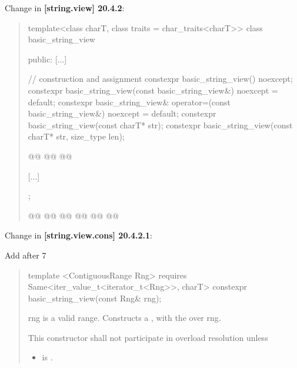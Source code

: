 \documentclass{wg21}
\begin{document}
Change in \textbf{[string.view] 20.4.2}:
\begin{quote}
\begin{codeblock}

template<class charT, class traits = char_traits<charT>>
class basic_string_view {
public:
	[...]

	// construction and assignment
	constexpr basic_string_view() noexcept;
	constexpr basic_string_view(const basic_string_view&) noexcept = default;
	constexpr basic_string_view& operator=(const basic_string_view&) noexcept = default;
	constexpr basic_string_view(const charT* str);
	constexpr basic_string_view(const charT* str, size_type len);

	@@
	@@
	@@

	[...]
};

@@
@@
@@
@@
@@
@\added{\qquad 	>;}@

\end{codeblock}
\end{quote}

Change in \textbf{[string.view.cons] 20.4.2.1}:

Add after 7

\begin{quote}
\begin{addedblock}
\begin{itemdecl}
template <ContiguousRange Rng>
requires Same<iter_value_t<iterator_t<Rng>>, charT>
constexpr basic_string_view(const Rng& rng);

\end{itemdecl}

\begin{itemdescr}
	\requires
	rng is a valid range.
	\effects
	Constructs a , with the over  rng.

	 \remarks This constructor shall not participate in overload resolution unless
	\begin{itemize}
		\item {} is .
	\end{itemize}
\end{itemdescr}
\end{addedblock}
\end{quote}
\end{document}
